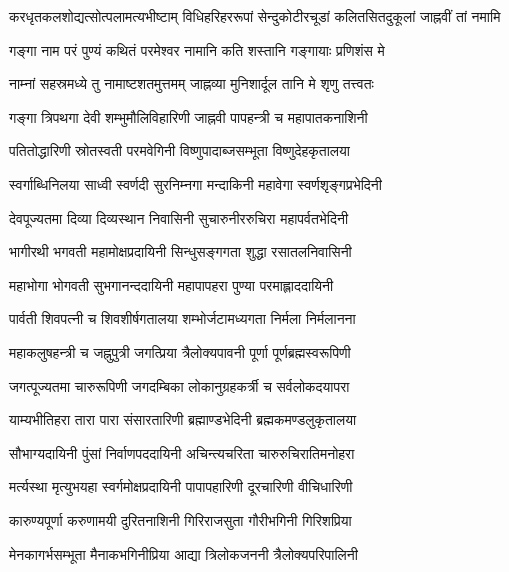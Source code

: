 
{करधृतकलशोद्यत्सोत्पलामत्यभीष्टाम्}
{विधिहरिहररूपां सेन्दुकोटीरचूडां}
{कलितसितदुकूलां जाह्नवीं तां नमामि}


\twolineshloka
{गङ्गा नाम परं पुण्यं कथितं परमेश्वर}
{नामानि कति शस्तानि गङ्गायाः प्रणिशंस मे}

\twolineshloka
{नाम्नां सहस्रमध्ये तु नामाष्टशतमुत्तमम्}
{जाह्नव्या मुनिशार्दूल तानि मे शृणु तत्त्वतः}

\twolineshloka
{गङ्गा त्रिपथगा देवी शम्भुमौलिविहारिणी}
{जाह्नवी पापहन्त्री च महापातकनाशिनी}

\twolineshloka
{पतितोद्धारिणी स्रोतस्वती परमवेगिनी}
{विष्णुपादाब्जसम्भूता विष्णुदेहकृतालया}

\twolineshloka
{स्वर्गाब्धिनिलया साध्वी स्वर्णदी सुरनिम्नगा}
{मन्दाकिनी महावेगा स्वर्णशृङ्गप्रभेदिनी}

\twolineshloka
{देवपूज्यतमा दिव्या दिव्यस्थान निवासिनी}
{सुचारुनीररुचिरा महापर्वतभेदिनी}

\twolineshloka
{भागीरथी भगवती महामोक्षप्रदायिनी}
{सिन्धुसङ्गगता शुद्धा रसातलनिवासिनी}

\twolineshloka
{महाभोगा भोगवती सुभगानन्ददायिनी}
{महापापहरा पुण्या परमाह्लाददायिनी}

\twolineshloka
{पार्वती शिवपत्नी च शिवशीर्षगतालया}
{शम्भोर्जटामध्यगता निर्मला निर्मलानना}

\twolineshloka
{महाकलुषहन्त्री च जह्नुपुत्री जगत्प्रिया}
{त्रैलोक्यपावनी पूर्णा पूर्णब्रह्मस्वरूपिणी}

\twolineshloka
{जगत्पूज्यतमा चारुरूपिणी जगदम्बिका}
{लोकानुग्रहकर्त्री च सर्वलोकदयापरा}

\twolineshloka
{याम्यभीतिहरा तारा पारा संसारतारिणी}
{ब्रह्माण्डभेदिनी ब्रह्मकमण्डलुकृतालया}

\twolineshloka
{सौभाग्यदायिनी पुंसां निर्वाणपददायिनी}
{अचिन्त्यचरिता चारुरुचिरातिमनोहरा}

\twolineshloka
{मर्त्यस्था मृत्युभयहा स्वर्गमोक्षप्रदायिनी}
{पापापहारिणी दूरचारिणी वीचिधारिणी}

\twolineshloka
{कारुण्यपूर्णा करुणामयी दुरितनाशिनी}
{गिरिराजसुता गौरीभगिनी गिरिशप्रिया}

\twolineshloka
{मेनकागर्भसम्भूता मैनाकभगिनीप्रिया}
{आद्या त्रिलोकजननी त्रैलोक्यपरिपालिनी}

